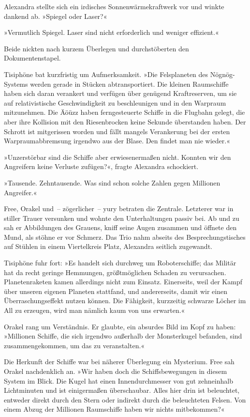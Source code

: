 Alexandra stellte sich ein irdisches Sonnenwärmekraftwerk vor und winkte dankend ab. »Spiegel oder Laser?«

»Vermutlich Spiegel. Laser sind nicht erforderlich und weniger effizient.«

Beide nickten nach kurzem Überlegen und durchstöberten den Dokumentenstapel.

Tisiphöne bat kurzfristig um Aufmerksamkeit. »Die Felsplaneten des Nögnög-Systems werden gerade in Stücken abtransportiert. Die kleinen Raumschiffe haben sich daran verankert und verfügen über genügend Kraftreserven, um sie auf relativistische Geschwindigkeit zu beschleunigen und in den Warpraum mitzunehmen. Die Äöüzz haben ferngesteuerte Schiffe in die Flugbahn gelegt, die aber ihre Kollision mit den Riesenbrocken keine Sekunde überstanden haben. Der Schrott ist mitgerissen worden und fällt mangels Verankerung bei der ersten Warpraumabbremsung irgendwo aus der Blase. Den findet man nie wieder.«

»Unzerstörbar sind die Schiffe aber erwiesenermaßen nicht. Konnten wir den Angreifern keine Verluste zufügen?«, fragte Alexandra schockiert.

»Tausende. Zehntausende. Was sind schon solche Zahlen gegen Millionen Angreifer.«

Free, Orakel und~– zögerlicher~– yury betraten die Zentrale. Letzterer war in stiller Trauer versunken und wohnte den Unterhaltungen passiv bei. Ab und zu sah er Abbildungen des Grauens, kniff seine Augen zusammen und öffnete den Mund, als stöhne er vor Schmerz. Das Trio nahm abseits des Besprechungstisches auf Stühlen in einem Viertelkreis Platz, Alexandra seitlich zugewandt.

Tisiphöne fuhr fort: »Es handelt sich durchweg um Roboterschiffe; das Militär hat da recht geringe Hemmungen, größtmöglichen Schaden zu verursachen. Planetenraketen kamen allerdings nicht zum Einsatz. Einerseits, weil der Kampf über unseren eigenen Planeten stattfand, und andererseits, damit wir einen Überraschungseffekt nutzen können. Die Fähigkeit, kurzzeitig schwarze Löcher im All zu erzeugen, wird man nämlich kaum von uns erwarten.«

Orakel rang um Verständnis. Er glaubte, ein absurdes Bild im Kopf zu haben: »Millionen Schiffe, die sich irgendwo außerhalb der Monsterkugel befanden, sind zusammengekommen, um das zu veranstalten.«

Die Herkunft der Schiffe war bei näherer Überlegung ein Mysterium. Free sah Orakel nachdenklich an. »Wir haben doch die Schiffsbewegungen in diesem System im Blick. Die Kugel hat einen Innendurchmesser von gut zehneinhalb Lichtminuten und ist einigermaßen überschaubar. Alles hier drin ist beleuchtet, entweder direkt durch den Stern oder indirekt durch die beleuchteten Felsen. Von einem Abzug der Millionen Raumschiffe haben wir nichts mitbekommen?«

